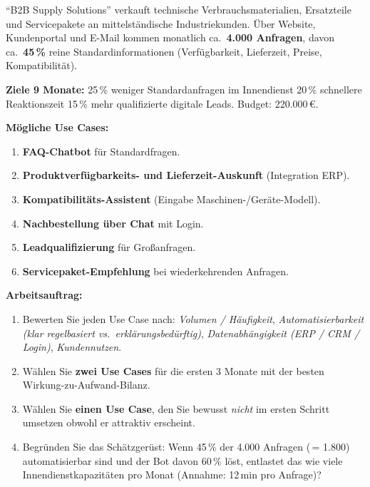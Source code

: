 \documentclass[11pt,a4paper,oneside]{article}
\begin{document}
\begin{infobox}[Kontext]
``B2B Supply Solutions'' verkauft technische Verbrauchsmaterialien, Ersatzteile und Servicepakete an mittelständische Industriekunden. Über Website, Kundenportal und E-Mail kommen monatlich ca.\ \textbf{4.000 Anfragen}, davon ca.\ \textbf{45\,\%} reine Standardinformationen (Verfügbarkeit, Lieferzeit, Preise, Kompatibilität).

\smallskip
\textbf{Ziele 9 Monate:} 25\,\% weniger Standardanfragen im Innendienst \textperiodcentered{} 20\,\% schnellere Reaktionszeit \textperiodcentered{} 15\,\% mehr qualifizierte digitale Leads. Budget: 220.000\,\euro.
\end{infobox}

\noindent\textbf{Mögliche Use Cases:}

\begin{enumerate}
  \item \textbf{FAQ-Chatbot} für Standardfragen.
  \item \textbf{Produktverfügbarkeits- und Lieferzeit-Auskunft} (Integration ERP).
  \item \textbf{Kompatibilitäts-Assistent} (Eingabe Maschinen-/Geräte-Modell).
  \item \textbf{Nachbestellung über Chat} mit Login.
  \item \textbf{Leadqualifizierung} für Großanfragen.
  \item \textbf{Servicepaket-Empfehlung} bei wiederkehrenden Anfragen.
\end{enumerate}

\noindent\textbf{Arbeitsauftrag:}

\begin{enumerate}
  \item Bewerten Sie jeden Use Case nach: \emph{Volumen / Häufigkeit}, \emph{Automatisierbarkeit (klar regelbasiert vs.\ erklärungsbedürftig)}, \emph{Datenabhängigkeit (ERP / CRM / Login)}, \emph{Kundennutzen}.
  \item Wählen Sie \textbf{zwei Use Cases} für die ersten 3 Monate \textendash{} mit der besten Wirkung-zu-Aufwand-Bilanz.
  \item Wählen Sie \textbf{einen Use Case}, den Sie bewusst \emph{nicht} im ersten Schritt umsetzen \textendash{} obwohl er attraktiv erscheint.
  \item Begründen Sie das Schätzgerüst: Wenn 45\,\% der 4.000 Anfragen (\,= 1.800) automatisierbar sind und der Bot davon 60\,\% löst, entlastet das wie viele Innendienstkapazitäten pro Monat (Annahme: 12\,min pro Anfrage)?
\end{enumerate}
\end{document}
